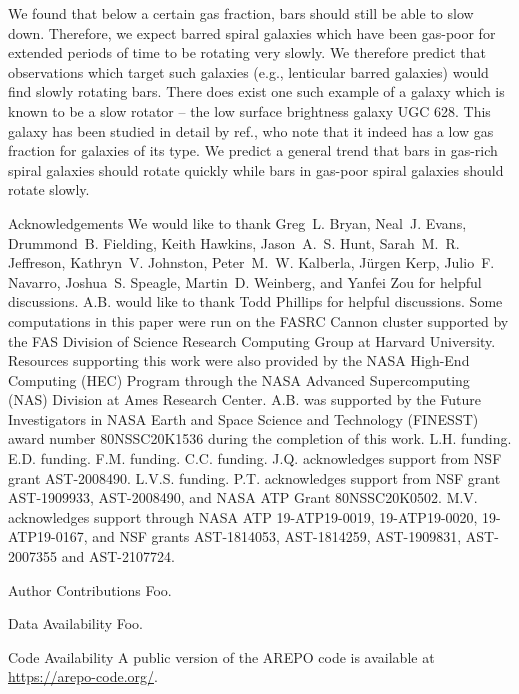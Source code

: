 \documentclass{natureprintstyle}
\begin{document}
We found that below a certain gas fraction, bars should still be able to slow
down. Therefore, we expect barred spiral galaxies which have been gas-poor for
extended periods of time to be rotating very slowly. We therefore predict that
observations which target such galaxies (e.g., lenticular barred
galaxies\cite{2009ARAA..47..159B}) would find slowly rotating bars. There does
exist one such example of a galaxy which is known to be a slow rotator -- the
low surface brightness galaxy UGC 628.\cite{2009AA...499L..25C} This galaxy
has been studied in detail by ref.\cite{2016MNRAS.463.1751C}, who note that it
indeed has a low gas fraction for galaxies of its type. We predict a general
trend that bars in gas-rich spiral galaxies should rotate quickly while bars
in gas-poor spiral galaxies should rotate slowly.





\begin{addendum}
  
\item [Acknowledgements] We would like to thank Greg~L. Bryan, Neal~J. Evans,
Drummond~B. Fielding, Keith Hawkins, Jason~A.~S. Hunt, Sarah~M.~R. Jeffreson,
Kathryn~V. Johnston, Peter~M.~W. Kalberla, Jürgen Kerp, Julio~F. Navarro,
Joshua~S. Speagle, Martin~D. Weinberg, and Yanfei Zou for helpful discussions.
A.B. would like to thank Todd Phillips for helpful discussions. Some
computations in this paper were run on the FASRC Cannon cluster supported by
the FAS Division of Science Research Computing Group at Harvard University.
Resources supporting this work were also provided by the NASA High-End
Computing (HEC) Program through the NASA Advanced Supercomputing (NAS)
Division at Ames Research Center. A.B. was supported by the Future
Investigators in NASA Earth and Space Science and Technology (FINESST) award
number 80NSSC20K1536 during the completion of this work. L.H. funding. E.D.
funding. F.M. funding. C.C. funding. J.Q. acknowledges support from NSF grant
AST-2008490. L.V.S. funding. P.T. acknowledges support from NSF grant
AST-1909933, AST-2008490, and NASA ATP Grant 80NSSC20K0502. M.V. acknowledges
support through NASA ATP 19-ATP19-0019, 19-ATP19-0020, 19-ATP19-0167, and NSF
grants AST-1814053, AST-1814259, AST-1909831, AST-2007355 and AST-2107724.

\item[Author Contributions] Foo.

  \item[Data Availability] Foo.
    
  \item[Code Availability] A public version of the AREPO code is available at
  \url{https://arepo-code.org/}.
    
\end{addendum}
\end{document}
